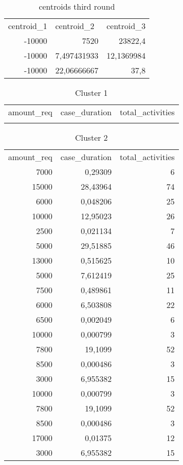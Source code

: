 \begin{table}[ht]
  \centering
  \caption{centroids third round}
    \begin{tabular}{rrr}
    \multicolumn{1}{l}{centroid\_1} & \multicolumn{1}{l}{centroid\_2} & \multicolumn{1}{l}{centroid\_3} \\
    -10000 & 7520  & 23822,4 \\
    -10000 & 7,497431933 & 12,1369984 \\
    -10000 & 22,06666667 & 37,8 \\
    \end{tabular}%
  \label{tab:cent3}%
\end{table}%


\begin{table}[ht]
  \centering
  \caption{Cluster 1}
    \begin{tabular}{rrr}
    \multicolumn{1}{l}{amount\_req} & \multicolumn{1}{l}{case\_duration} & \multicolumn{1}{l}{total\_activities} \\
          &       &  \\
    \end{tabular}%
  \label{tab:clust1}%
\end{table}%
\begin{table}[htbp]
  \centering
  \caption{Cluster 2}
       \begin{tabular}{rrr}
    \multicolumn{1}{l}{amount\_req} & \multicolumn{1}{l}{case\_duration} & \multicolumn{1}{l}{total\_activities} \\
    7000  & 0,29309 & 6 \\
    15000 & 28,43964 & 74 \\
    6000  & 0,048206 & 25 \\
    10000 & 12,95023 & 26 \\
    2500  & 0,021134 & 7 \\
    5000  & 29,51885 & 46 \\
    13000 & 0,515625 & 10 \\
    5000  & 7,612419 & 25 \\
    7500  & 0,489861 & 11 \\
    6000  & 6,503808 & 22 \\
    6500  & 0,002049 & 6 \\
    10000 & 0,000799 & 3 \\
    7800  & 19,1099 & 52 \\
    8500  & 0,000486 & 3 \\
    3000  & 6,955382 & 15 \\
    10000 & 0,000799 & 3 \\
    7800  & 19,1099 & 52 \\
    8500  & 0,000486 & 3 \\
    17000 & 0,01375 & 12 \\
    3000  & 6,955382 & 15 \\
    \end{tabular}%
  \label{tab:clust2}%
\end{table}%
